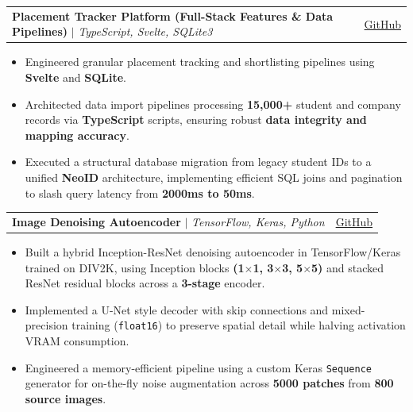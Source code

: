 \documentclass[letterpaper,10pt]{article}
\makeatletter
\newcommand{\resumeItem}[1]{
  \item\small{#1\vspace{-2pt}}
}
\newcommand{\resumeProjectHeading}[2]{
  \vspace{-2pt}\item
    \begin{tabular*}{0.97\textwidth}{l@{\extracolsep{\fill}}r}
      \small#1 & \small #2 \\
    \end{tabular*}\vspace{-7pt}
}
\newcommand{\resumeItemListStart}{\begin{itemize}[leftmargin=0.3in]}
\newcommand{\resumeItemListEnd}{\end{itemize}\vspace{-5pt}}
\makeatother
\begin{document}

  \resumeProjectHeading
    {\textbf{Placement Tracker Platform (Full-Stack Features \& Data Pipelines)} $|$ \emph{TypeScript, Svelte, SQLite3}}
    {\href{https://github.com/dreamgamer5000}{\faIcon{github} GitHub}}
  \resumeItemListStart
    \resumeItem{Engineered granular placement tracking and shortlisting pipelines using \textbf{Svelte} and \textbf{SQLite}.}
    \resumeItem{Architected data import pipelines processing \textbf{15,000+} student and company records via \textbf{TypeScript} scripts, ensuring robust \textbf{data integrity and mapping accuracy}.}
    \resumeItem{Executed a structural database migration from legacy student IDs to a unified \textbf{NeoID} architecture, implementing efficient SQL joins and pagination to slash query latency from \textbf{2000ms to 50ms}.}
  \resumeItemListEnd

  \resumeProjectHeading
    {\textbf{Image Denoising Autoencoder} $|$ \emph{TensorFlow, Keras, Python}}
    {\href{https://github.com/kaezrr/image-denoiser-scaler}{\faIcon{github} GitHub}}
  \resumeItemListStart
    \resumeItem{Built a hybrid Inception-ResNet denoising autoencoder in TensorFlow/Keras trained on DIV2K, using Inception blocks \textbf{(1$\times$1, 3$\times$3, 5$\times$5)} and stacked ResNet residual blocks across a \textbf{3-stage} encoder.}
    \resumeItem{Implemented a U-Net style decoder with skip connections and mixed-precision training (\texttt{float16}) to preserve spatial detail while halving activation VRAM consumption.}
    \resumeItem{Engineered a memory-efficient pipeline using a custom Keras \texttt{Sequence} generator for on-the-fly noise augmentation across \textbf{5000 patches} from \textbf{800 source images}.}
  \resumeItemListEnd
\end{document}

